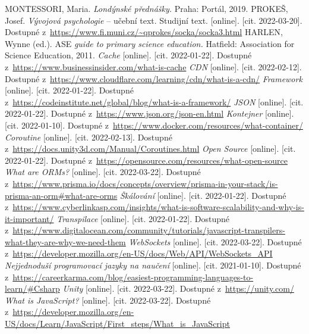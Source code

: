 \begin{thebibliography}{99}
    
     MONTESSORI, Maria. \textit{Londýnské přednášky.}  Praha: Portál, 2019.
      PROKEŠ, Josef. \textit{Vývojová psychologie} – učební text. Studijní text. [online]. [cit. 2022-03-20]. Dostupné z~\url{https://www.fi.muni.cz/~qprokes/socka/socka3.html}
     HARLEN, Wynne (ed.). ASE \textit{guide to primary science education.} Hatfield: Association for Science Education, 2011.
     \textit{Cache} [online]. [cit. 2022-01-22]. Dostupné z~\url{https://www.businessinsider.com/what-is-cache}
     \textit{CDN} [online]. [cit. 2022-02-12]. Dostupné z~\url{https://www.cloudflare.com/learning/cdn/what-is-a-cdn/}
     \textit{Framework} [online]. [cit. 2022-01-22]. Dostupné z~\url{https://codeinstitute.net/global/blog/what-is-a-framework/}
     \textit{JSON} [online]. [cit. 2022-01-22]. Dostupné z~\url{https://www.json.org/json-en.html}
     \textit{Kontejner} [online]. [cit. 2022-01-10]. Dostupné z~\url{https://www.docker.com/resources/what-container/}
     \textit{Coroutine} [online]. [cit. 2022-02-13]. Dostupné z~\url{https://docs.unity3d.com/Manual/Coroutines.html}
     \textit{Open Source} [online]. [cit. 2022-01-22]. Dostupné z~\url{https://opensource.com/resources/what-open-source}
     \textit{What are ORMs?} [online]. [cit. 2022-03-22]. Dostupné z~\url{https://www.prisma.io/docs/concepts/overview/prisma-in-your-stack/is-prisma-an-orm#what-are-orms}
     \textit{Škálování} [online]. [cit. 2022-01-22]. Dostupné z~\url{https://www.cyberlinkasp.com/insights/what-is-software-scalability-and-why-is-it-important/}
     \textit{Transpilace} [online]. [cit. 2022-01-22]. Dostupné z~\url{https://www.digitalocean.com/community/tutorials/javascript-transpilers-what-they-are-why-we-need-them}
     \textit{WebSockets} [online]. [cit. 2022-03-22]. Dostupné z~\url{https://developer.mozilla.org/en-US/docs/Web/API/WebSockets_API}
     \textit{Nejjednoduší programovací jazyky na naučení} [online]. [cit. 2021-01-10]. Dostupné z~\url{https://careerkarma.com/blog/easiest-programming-languages-to-learn/#Csharp}
     \textit{Unity} [online]. [cit. 2022-03-22]. Dostupné z~\url{https://unity.com/}
     \textit{What is JavaScript?} [online]. [cit. 2022-03-22]. Dostupné z~\url{https://developer.mozilla.org/en-US/docs/Learn/JavaScript/First_steps/What_is_JavaScript}

\end{thebibliography}
